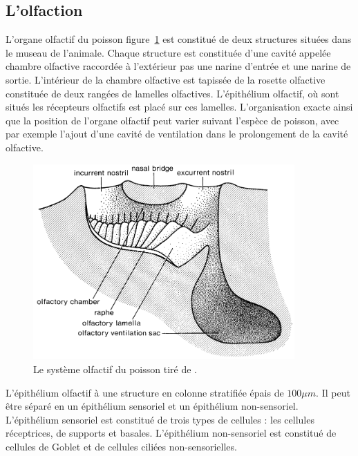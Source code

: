   \subsection{L'olfaction}
  L'organe olfactif du poisson figure~\ref{olfactory_schematic} est constitué de deux structures situées dans le museau de l'animale. Chaque structure est constituée d'une cavité appelée chambre olfactive raccordée à l'extérieur pas une narine d'entrée et une narine de sortie. L'intérieur de la chambre olfactive est tapissée de la rosette olfactive constituée de deux rangées de lamelles olfactives. L'épithélium olfactif, où sont situés les récepteurs olfactifs est placé sur ces lamelles. L'organisation exacte ainsi que la position de l'organe olfactif peut varier suivant l'espèce de poisson, avec par exemple l'ajout d'une cavité de ventilation dans le prolongement de la cavité olfactive.
  \begin{figure}[!h]
    \centering
    \includegraphics[width=10cm]{part_2/assets/olfactory_schematic.png}
    \caption{Le système olfactif du poisson tiré de \cite{hara2012fish}.}
    \label{olfactory_schematic}
  \end{figure}
  \medbreak
  L'épithélium olfactif à une structure en colonne stratifiée épais de $100\mu m$. Il peut être séparé en un épithélium sensoriel et un épithélium non-sensoriel. L'épithélium sensoriel est constitué de trois types de cellules : les cellules réceptrices, de supports et basales. L'épithélium non-sensoriel est constitué de cellules de Goblet et de cellules ciliées non-sensorielles.
  \medbreak
